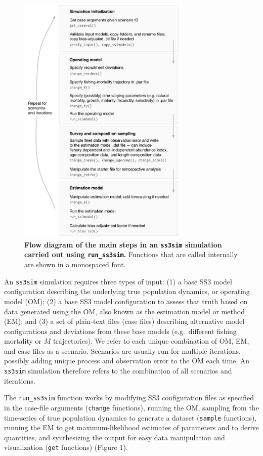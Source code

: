 \documentclass[12pt]{article}
\begin{document}
\begin{figure}[htb]
\begin{center}
\includegraphics[width=3.27in]{sim-steps.pdf}
\end{center}
\caption{
{\bf Flow diagram of the main steps
in an \texttt{ss3sim} simulation carried out using \texttt{run\_ss3sim}.}
Functions that are called internally are shown in a monospaced font.
}
\label{fig:sim-steps}
\end{figure}


An \texttt{ss3sim} simulation requires three types of input: (1) a base SS3 model configuration describing the underlying true population dynamics, or operating model (OM); (2) a base SS3 model configuration to assess that truth based on data generated using the OM, also known as the estimation model or method (EM); and (3) a set of plain-text files (case files) describing alternative model configurations and deviations from these base models (e.g.~different fishing mortality or $M$ trajectories). We refer to each unique combination of OM, EM, and case files as a scenario. Scenarios are usually run for multiple iterations, possibly adding unique process and observation error to the OM each time. An \texttt{ss3sim} simulation therefore refers to the combination of all scenarios and iterations.

The \texttt{run\_ss3sim} function works by modifying SS3 configuration files as specified in the case-file arguments (\texttt{change} functions), running the OM, sampling from the time-series of true population dynamics to generate a dataset (\texttt{sample} functions), running the EM to get maximum-likelihood estimates of parameters and to derive quantities, and synthesizing the output for easy data manipulation and visualization (\texttt{get} functions) (Figure 1).
\end{document}
